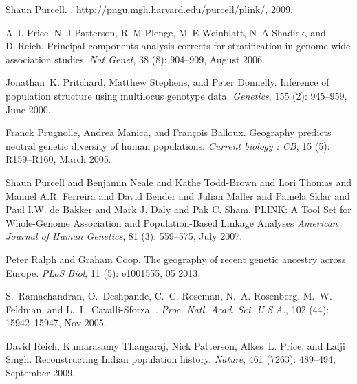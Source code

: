 \documentclass[10pt,letterpaper]{article}
\begin{document}
\begin{thebibliography}{80}
Shaun Purcell.
.
\newblock \url{http://pngu.mgh.harvard.edu/purcell/plink/}, 2009.

A~L Price, N~J Patterson, R~M Plenge, M~E Weinblatt, N~A Shadick, and D~Reich.
\newblock Principal components analysis corrects for stratification in
  genome-wide association studies.
\newblock \emph{Nat Genet}, 38 (8): 904--909, August 2006.

Jonathan~K. Pritchard, Matthew Stephens, and Peter Donnelly.
\newblock Inference of population structure using multilocus genotype data.
\newblock \emph{Genetics}, 155 (2): 945--959, June 2000.

Franck Prugnolle, Andrea Manica, and Fran{\c c}ois Balloux.
\newblock Geography predicts neutral genetic diversity of human populations.
\newblock \emph{Current biology : {CB}}, 15 (5): R159--R160,
  March 2005.
  
Shaun Purcell and Benjamin Neale and Kathe Todd-Brown and Lori Thomas and Manuel A.R. Ferreira and David Bender and Julian Maller and Pamela Sklar and Paul I.W. de Bakker and Mark J. Daly and Pak C. Sham.
\newblock PLINK: A Tool Set for Whole-Genome Association and Population-Based Linkage Analyses 
\newblock \emph{American Journal of Human Genetics}, 81 (3):
559--575, July 2007.

Peter Ralph and Graham Coop.
\newblock The geography of recent genetic ancestry across {Europe}.
\newblock \emph{PLoS Biol}, 11 (5): e1001555, 05 2013.

S.~Ramachandran, O.~Deshpande, C.~C. Roseman, N.~A. Rosenberg, M.~W. Feldman,
  and L.~L. Cavalli-Sforza.
.
\newblock \emph{Proc. Natl. Acad. Sci. U.S.A.}, 102 (44):
  15942--15947, Nov 2005.

David Reich, Kumarasamy Thangaraj, Nick Patterson, Alkes~L. Price, and Lalji
  Singh.
\newblock Reconstructing {Indian} population history.
\newblock \emph{Nature}, 461 (7263): 489--494, September
  2009.


\end{thebibliography}
\end{document}
